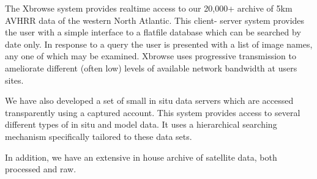 	The Xbrowse system provides realtime access to our 20,000+ 
archive of 5km AVHRR data of the western North Atlantic.  This client-
server system provides the user with a simple interface to a flatfile 
database which can be searched by date only.  In response to a query the 
user is presented with a list of image names, any one of which may be 
examined.  Xbrowse uses progressive transmission to ameliorate different 
(often low) levels of available network bandwidth at users sites.

	We have also developed a set of small in situ data servers which are 
accessed transparently using a captured account.  This system provides 
access to several different types of in situ and model data.  It uses a 
hierarchical searching mechanism specifically tailored to these data sets.

	In addition, we have an extensive in house archive of satellite data, 
both processed and raw.
\newpage

